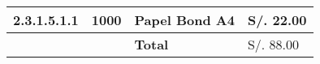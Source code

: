 \begin{table}[h!]
\begin{tabular}{|p{2.2cm}|p{1.8cm}|p{3.8cm}|p{2.2cm}|}
                2.3.1.5.1.1 &
                1000 &
                Papel Bond A4 &
                S/. 22.00
                \\ \hline

                &
                &
                \bf{Total} &
                S/. 88.00
                \\ \hline
                \end{tabular}
            \end{table}
